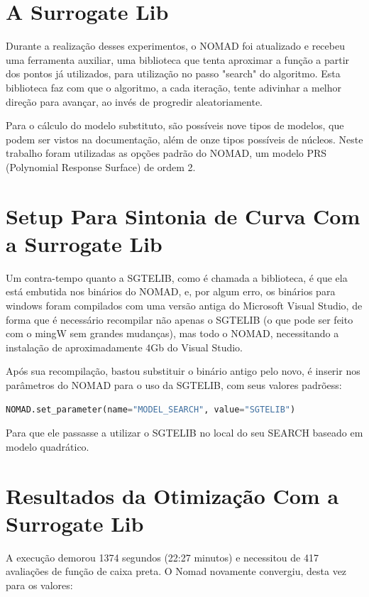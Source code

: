 \section{A Surrogate Lib}

Durante a realização desses experimentos, o NOMAD foi atualizado e recebeu uma ferramenta auxiliar, uma biblioteca que tenta aproximar a função a partir dos pontos já utilizados, para utilização no passo "search" do algoritmo. Esta biblioteca faz com que o algoritmo, a cada iteração, tente adivinhar a melhor direção para avançar, ao invés de progredir aleatoriamente.

Para o cálculo do modelo substituto, são possíveis nove tipos de modelos, que podem ser vistos na documentação, além de onze tipos possíveis de núcleos. Neste trabalho foram utilizadas as opções padrão do NOMAD, um modelo PRS (Polynomial Response Surface) de ordem 2.


\section{Setup Para Sintonia de Curva Com a Surrogate Lib}

Um contra-tempo quanto a SGTELIB, como é chamada a biblioteca, é que ela está embutida nos binários do NOMAD, e, por algum erro, os binários para windows foram compilados com uma versão antiga do Microsoft Visual Studio, de forma que é necessário recompilar não apenas o SGTELIB (o que pode ser feito com o mingW sem grandes mudanças), mas todo o NOMAD, necessitando a instalação de aproximadamente 4Gb do Visual Studio.

Após sua recompilação, bastou substituir o binário antigo pelo novo, é inserir nos parâmetros do NOMAD para o uso da SGTELIB, com seus valores padrõess:
\begin{lstlisting}[language=Python]
NOMAD.set_parameter(name="MODEL_SEARCH", value="SGTELIB")
\end{lstlisting}
Para que ele passasse a utilizar o SGTELIB no local do seu SEARCH baseado em modelo quadrático.


\section{Resultados da Otimização Com a Surrogate Lib}

A execução demorou 1374 segundos (22:27 minutos) e necessitou de 417 avaliações de função de caixa preta. O Nomad novamente convergiu, desta vez para os 	valores:

